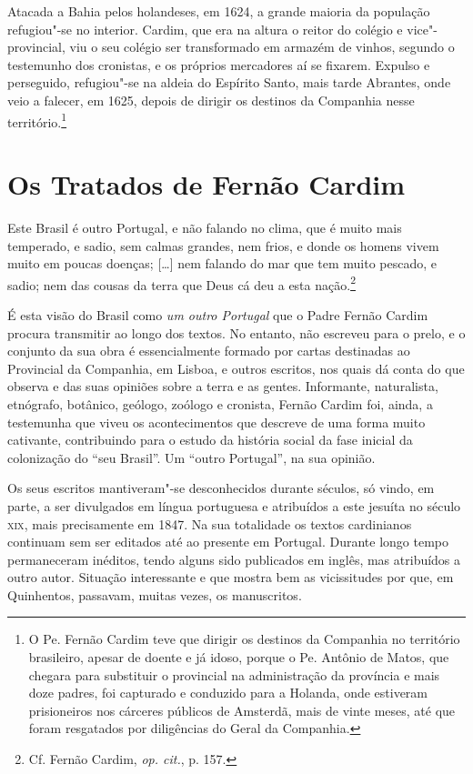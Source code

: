 Atacada a Bahia pelos holandeses, em 1624, a grande maioria da
população refugiou"-se no interior. Cardim, que era na altura o reitor
do colégio e vice"-provincial, viu o seu colégio ser transformado em
armazém de vinhos, segundo o testemunho dos cronistas, e os próprios
mercadores aí se fixarem. Expulso e perseguido, refugiou"-se na aldeia
do Espírito Santo, mais tarde Abrantes, onde veio a falecer, em 1625,
depois de dirigir os destinos da Companhia nesse território.\footnote{ O Pe. 
Fernão Cardim teve que dirigir os destinos da Companhia no
território brasileiro, apesar de doente e já idoso, porque o Pe. Antônio 
de Matos, que chegara para substituir o provincial na
administração da província e mais doze padres, foi capturado e
conduzido para a Holanda, onde estiveram prisioneiros nos cárceres
públicos de Amsterdã, mais de vinte meses, até que foram resgatados
por diligências do Geral da Companhia.} 

\section*{Os Tratados de Fernão Cardim}

\begin{hedraquote}
Este Brasil é outro Portugal, e não falando no clima,
que é muito mais temperado, e sadio, sem calmas grandes, nem frios, e
donde os homens vivem muito em poucas doenças; [\ldots{}] nem falando do mar
que tem muito pescado, e sadio; nem das cousas da terra que Deus cá deu
a esta nação.\footnote{ Cf. Fernão Cardim, \textit{op. cit.}, p. 157.}
\end{hedraquote}

É esta visão do Brasil como \textit{um outro Portugal} que o Padre
Fernão Cardim procura transmitir ao longo dos textos. No entanto, não
escreveu para o prelo, e o conjunto da sua obra é essencialmente formado
por cartas destinadas ao Provincial da Companhia, em Lisboa, e outros
escritos, nos quais dá conta do que observa e das suas opiniões sobre a
terra e as gentes. Informante, naturalista, etnógrafo, botânico,
geólogo, zoólogo e cronista, Fernão Cardim foi, ainda, a testemunha que
viveu os acontecimentos que descreve de uma forma muito cativante,
contribuindo para o estudo da história social da fase inicial da
colonização do ``seu Brasil''. Um ``outro Portugal'', na sua opinião.

Os seus escritos mantiveram"-se desconhecidos durante séculos, só
vindo, em parte, a ser divulgados em língua portuguesa e atribuídos a
este jesuíta no século \textsc{xix}, mais precisamente em 1847. Na sua
totalidade os textos cardinianos continuam sem ser editados até ao
presente em Portugal. Durante longo tempo permaneceram inéditos, tendo
alguns sido publicados em inglês, mas atribuídos a outro autor.
Situação interessante e que mostra bem as vicissitudes por que, em
Quinhentos, passavam, muitas vezes, os manuscritos.

